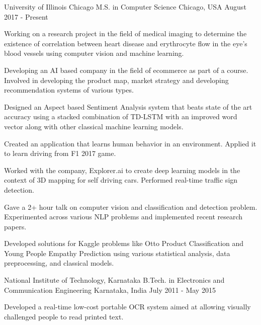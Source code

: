 

\begin{cventries}

  \cventry
    {University of Illinois Chicago} %
    {M.S. in Computer Science} %
    {Chicago, USA} %
    {August 2017 - Present} %
    {
      \begin{cvitems} %
        \item {Working on a research project in the field of medical imaging to determine the existence of correlation between heart disease and erythrocyte flow in the eye's blood vessels using computer vision and machine learning.}
        \item {Developing an AI based company in the field of ecommerce as part of a course. Involved in developing the product map, market strategy and developing recommendation systems of various types.}
        \item {Designed an Aspect based Sentiment Analysis system that beats state of the art accuracy using a stacked combination of TD-LSTM with an improved word vector along with other classical machine learning models.}
        \item {Created an application that learns human behavior in an environment. Applied it to learn driving from F1 2017 game.}
        \item {Worked with the company, Explorer.ai to create deep learning models in the context of 3D mapping for self driving cars. Performed real-time traffic sign detection.}
        \item {Gave a 2+ hour talk on computer vision and classification and detection problem. Experimented across various NLP problems and implemented recent research papers.}
        \item {Developed solutions for Kaggle problems like Otto Product Classification and Young People Empathy Prediction using various statistical analysis, data preprocessing, and classical models.}
      \end{cvitems}
    }

  \cventry
    {National Institute of Technology, Karnataka} %
    {B.Tech. in Electronics and Communication Engineering} %
    {Karnataka, India} %
    {July 2011 - May 2015} %
    {
      \begin{cvitems} %
        \item {Developed a real-time low-cost portable OCR system aimed at allowing visually challenged people to read printed text.}
      \end{cvitems}
    }

\end{cventries}
